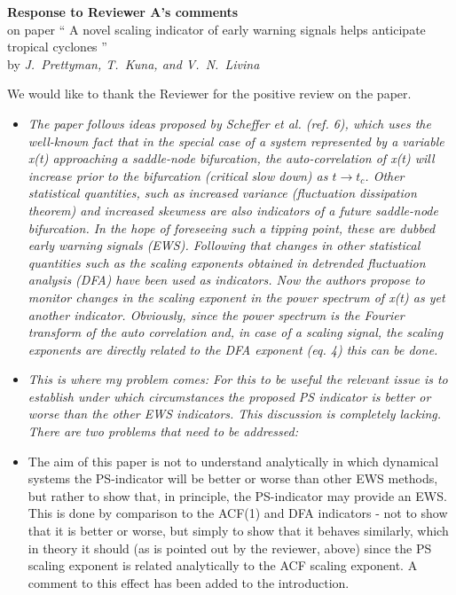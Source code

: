 \documentclass[12pt]{article}
\begin{document}
\begin{center}
{\bf Response to Reviewer A's comments}\\
on paper `` A novel scaling indicator of early warning signals helps anticipate tropical cyclones ''\\[5pt]
by {\it J.~Prettyman, T.~Kuna, and V.~N.~Livina}
\end{center}

\vspace{3mm}

\noindent We would like to thank the Reviewer for the positive review on the paper. 

\begin{itemize}
\item[\bf Preamble.]
{\sl
The paper follows ideas proposed by Scheffer et al. (ref. 6), which uses the well-known fact that in the special case of a system represented by a variable x(t) approaching a saddle-node bifurcation, the auto-correlation of x(t) will increase prior to the bifurcation (critical slow down) as $t \rightarrow t_c$. Other statistical quantities, such as increased variance (fluctuation dissipation theorem) and increased skewness are also indicators of a future saddle-node bifurcation. In the hope of foreseeing such a tipping point, these are dubbed early warning signals (EWS). Following that changes in other statistical quantities such as the scaling exponents obtained in detrended fluctuation analysis (DFA) have been used as indicators. Now the authors propose to monitor changes in the scaling exponent in the power spectrum of x(t) as yet another indicator. Obviously, since the power spectrum is the Fourier transform of the auto correlation and, in case of a scaling signal, the scaling exponents are directly related to the DFA exponent (eq. 4) this can be done.
}

\item[\bf Comment 1.] 
{\sl 
This is where my problem comes: For this to be useful the relevant issue is to establish under which circumstances the proposed PS indicator is better or worse than the other EWS indicators. This discussion is completely lacking. There are two problems that need to be addressed:
}

\item[\bf Response 1.] 
The aim of this paper is not to understand analytically in which dynamical systems the PS-indicator will be better or worse than other EWS methods, but rather to show that, in principle, the PS-indicator may provide an EWS. This is done by comparison to the ACF(1) and DFA indicators - not to show that it is better or worse, but simply to show that it behaves similarly, which in theory it should (as is pointed out by the reviewer, above) since the PS scaling exponent is related analytically to the ACF scaling exponent. A comment to this effect has been added to the introduction.


\end{itemize}
\end{document}
